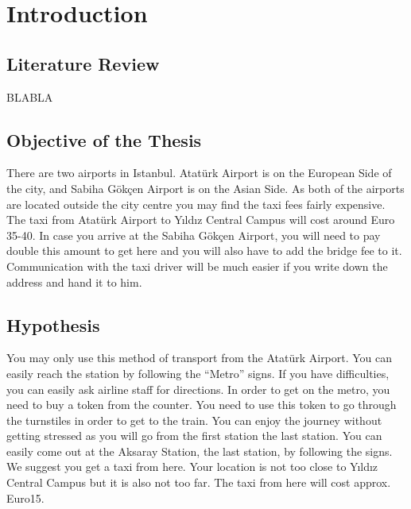 \chapter{Introduction}

\section{Literature Review}
BLABLA



\section{Objective of the Thesis}
There are two airports in Istanbul. Atatürk Airport is on the European Side of the city, and Sabiha Gökçen Airport is on the Asian Side. As both of the airports are located outside the city centre you may find the taxi\cite{rao2012novel} fees fairly expensive. The taxi from Atatürk Airport to Yıldız Central Campus will cost around Euro 35-40. In case you arrive at the Sabiha Gökçen Airport, you will need to pay double this amount to get here and you will also have to add the bridge fee to it. Communication with the taxi driver will be much easier if you write down the address and hand it to him.

\section{Hypothesis}
You may only use this method of transport from the Atatürk Airport. You can easily reach the station by following the “Metro” signs. If you have difficulties, you can easily ask airline staff for directions. In order to get on the metro, you need to buy a token from the counter. You need to use this token to go through the turnstiles in order to get to the train. You can enjoy the journey without getting stressed as you will go from the first station the last station. You can easily come out at the Aksaray Station, the last station, by following the signs. We suggest you get a taxi from here. Your location is not too close to Yıldız Central Campus but it is also not too far. The taxi from here will cost approx. Euro15.